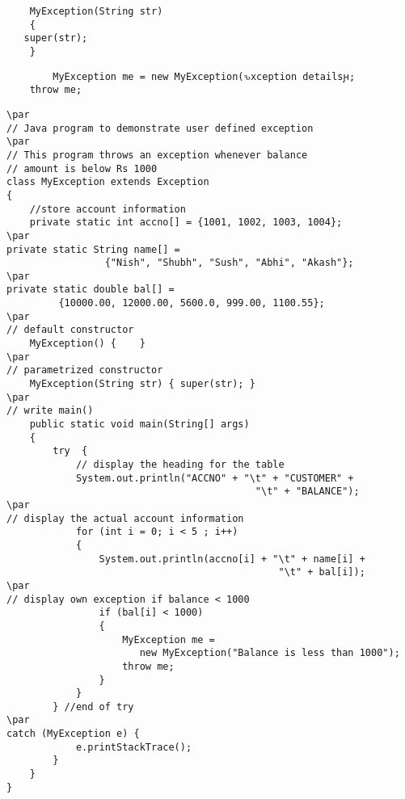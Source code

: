 \documentclass{book}
\def\lthtmlcheckvsize{\ifdim\ht\sizebox<\vsize 
  \ifdim\wd\sizebox<\hsize\expandafter\hfill\fi \expandafter\vfill
  \else\expandafter\vss\fi}%
\begin{document}
{\newpage\clearpage
{}%
\begin{lstlisting}
	MyException(String str)
	{
   super(str);
	}
	\end{lstlisting}%
\lthtmlfigureZ
\lthtmlcheckvsize\clearpage}

{\newpage\clearpage
{}%
\begin{lstlisting}
		MyException me = new MyException(ԅxception detailsԩ;
    throw me;
	\end{lstlisting}%
\lthtmlfigureZ
\lthtmlcheckvsize\clearpage}

{\newpage\clearpage
{}%
\begin{lstlisting}
\par
// Java program to demonstrate user defined exception 
\par
// This program throws an exception whenever balance 
// amount is below Rs 1000 
class MyException extends Exception 
{ 
    //store account information 
    private static int accno[] = {1001, 1002, 1003, 1004}; 
\par
private static String name[] = 
                 {"Nish", "Shubh", "Sush", "Abhi", "Akash"}; 
\par
private static double bal[] = 
         {10000.00, 12000.00, 5600.0, 999.00, 1100.55}; 
\par
// default constructor 
    MyException() {    } 
\par
// parametrized constructor 
    MyException(String str) { super(str); } 
\par
// write main() 
    public static void main(String[] args) 
    { 
        try  { 
            // display the heading for the table 
            System.out.println("ACCNO" + "\t" + "CUSTOMER" + 
                                           "\t" + "BALANCE"); 
\par
// display the actual account information 
            for (int i = 0; i < 5 ; i++) 
            { 
                System.out.println(accno[i] + "\t" + name[i] + 
                                               "\t" + bal[i]); 
\par
// display own exception if balance < 1000 
                if (bal[i] < 1000) 
                { 
                    MyException me = 
                       new MyException("Balance is less than 1000"); 
                    throw me; 
                } 
            } 
        } //end of try 
\par
catch (MyException e) { 
            e.printStackTrace(); 
        } 
    } 
} 
\end{lstlisting}%
\lthtmlfigureZ
\lthtmlcheckvsize\clearpage}
\end{document}
